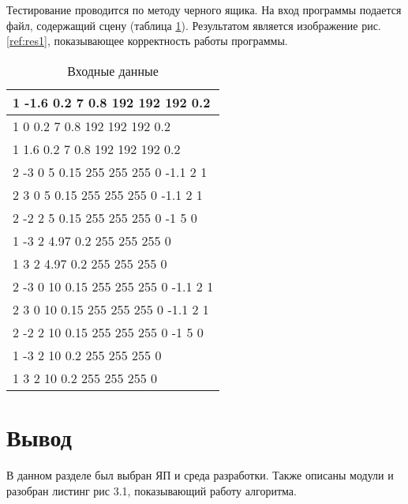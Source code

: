 Тестирование проводится по методу черного ящика.
На вход программы подается файл, содержащий сцену (таблица \ref{table:ref1}).
Результатом является изображение рис. \ref{ref:res1}, показывающее корректность работы программы.

\begin{table}
	\centering
	\begin{tabular}{| l |}
		\hline
		1  -1.6 0.2 7 0.8 192 192 192 0.2     \\ \hline
		1 0 0.2 7 0.8 192 192 192 0.2         \\  \hline
		1 1.6 0.2 7 0.8 192 192 192 0.2       \\  \hline
		2 -3 0 5 0.15 255 255 255 0 -1.1 2 1  \\  \hline
		2 3 0 5 0.15 255 255 255 0 -1.1 2 1   \\  \hline
		2 -2 2 5 0.15 255 255 255 0 -1 5 0    \\  \hline
		1 -3 2 4.97 0.2 255 255 255 0         \\  \hline
		1 3 2 4.97 0.2 255 255 255 0          \\  \hline
		2 -3 0 10 0.15 255 255 255 0 -1.1 2 1 \\  \hline
		2 3 0 10 0.15 255 255 255 0 -1.1 2 1  \\  \hline
		2 -2 2 10 0.15 255 255 255 0 -1 5 0   \\  \hline
		1 -3 2 10 0.2 255 255 255 0           \\  \hline
		1 3 2 10 0.2 255 255 255 0            \\  \hline
	\end{tabular}
	\caption{Входные данные}
	\label{table:ref1}
\end{table}


\section{Вывод}

В данном разделе был выбран ЯП и среда разработки.
Также описаны модули и разобран листинг рис 3.1, показывающий работу алгоритма.